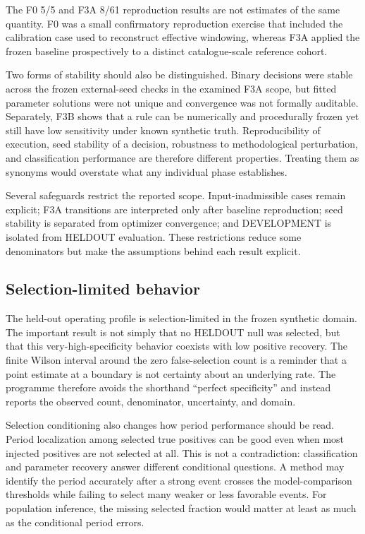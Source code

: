 \documentclass[11pt,a4paper]{article}
\begin{document}
The F0 5/5 and F3A 8/61 reproduction results are not estimates of the same quantity. F0 was a small confirmatory reproduction exercise that included the calibration case used to reconstruct effective windowing, whereas F3A applied the frozen baseline prospectively to a distinct catalogue-scale reference cohort.

Two forms of stability should also be distinguished. Binary decisions were stable across the frozen external-seed checks in the examined F3A scope, but fitted parameter solutions were not unique and convergence was not formally auditable. Separately, F3B shows that a rule can be numerically and procedurally frozen yet still have low sensitivity under known synthetic truth. Reproducibility of execution, seed stability of a decision, robustness to methodological perturbation, and classification performance are therefore different properties. Treating them as synonyms would overstate what any individual phase establishes.

Several safeguards restrict the reported scope. Input-inadmissible cases remain explicit; F3A transitions are interpreted only after baseline reproduction; seed stability is separated from optimizer convergence; and DEVELOPMENT is isolated from HELDOUT evaluation. These restrictions reduce some denominators but make the assumptions behind each result explicit.

\subsection{Selection-limited behavior}
The held-out operating profile is selection-limited in the frozen synthetic domain. The important result is not simply that no HELDOUT null was selected, but that this very-high-specificity behavior coexists with low positive recovery. The finite Wilson interval around the zero false-selection count is a reminder that a point estimate at a boundary is not certainty about an underlying rate. The programme therefore avoids the shorthand ``perfect specificity'' and instead reports the observed count, denominator, uncertainty, and domain.

Selection conditioning also changes how period performance should be read. Period localization among selected true positives can be good even when most injected positives are not selected at all. This is not a contradiction: classification and parameter recovery answer different conditional questions. A method may identify the period accurately after a strong event crosses the model-comparison thresholds while failing to select many weaker or less favorable events. For population inference, the missing selected fraction would matter at least as much as the conditional period errors.
\end{document}

